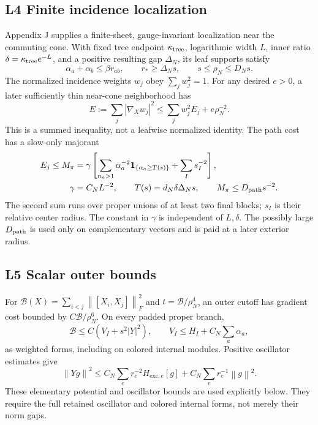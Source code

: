 \documentclass[11pt,letterpaper]{article}
\theoremstyle{definition}\newtheorem{hypothesis}[theorem]{Hypothesis}
\newcommand{\exc}{\mathrm{exc}}
\newcommand{\norm}[1]{\left\lVert #1\right\rVert}
\numberwithin{equation}{section}
\begin{document}
\subsection{L4 Finite incidence localization}
Appendix J supplies a finite-sheet, gauge-invariant localization near the commuting cone. With fixed tree endpoint $\kappa_{\rm tree}$, logarithmic width $L$, inner ratio $\delta=\kappa_{\rm tree}e^{-L}$, and a positive resulting gap $\Delta_N$, its leaf supports satisfy
\begin{equation}
 \alpha_a+\alpha_b\le\beta r_{ab},\qquad
 r_*\ge\Delta_Ns,\qquad s\le\rho_N\le D_Ns.\label{eq:shapes}
\end{equation}
The normalized incidence weights $w_j$ obey $\sum_jw_j^2=1$. For any desired $e>0$, a later sufficiently thin near-cone neighborhood has
\begin{equation}
 E:=\sum_j|\nabla_Xw_j|^2\le\sum_jw_j^2E_j+e\rho_N^{-2}.\label{eq:imsdefect}
\end{equation}
This is a summed inequality, not a leafwise normalized identity. The path cost has a slow-only majorant
\begin{align}
 E_j\le M_\pi&=\gamma\left[
 \sum_{n_a>1}\alpha_a^{-2}\mathbf1_{\{\alpha_a\ge T(s)\}}
 +\sum_{I}s_I^{-2}\right],\label{eq:majorant}\\
 \gamma&=C_NL^{-2},\qquad T(s)=d_N\delta\Delta_Ns,\qquad M_\pi\le D_{\rm path}s^{-2}.
\end{align}
The second sum runs over proper unions of at least two final blocks; $s_I$ is their relative center radius. The constant in $\gamma$ is independent of $L,\delta$. The possibly large $D_{\rm path}$ is used only on complementary vectors and is paid at a later exterior radius.

\subsection{L5 Scalar outer bounds}
For $\mathcal B(X)=\sum_{i<j}\norm{[X_i,X_j]}_F^2$ and $t=\mathcal B/\rho_N^4$, an outer cutoff has gradient cost bounded by $C\mathcal B/\rho_N^6$. On every padded proper branch,
\begin{equation}
 \mathcal B\le C(V_I+s^2|Y|^2),\qquad
 V_I\le H_I+C_N\sum_a\alpha_a,
\end{equation}
as weighted forms, including on colored internal modules. Positive oscillator estimates give
\begin{equation}
 \norm{Yg}^2\le C_N\sum_er_e^{-2}H_{\exc,e}[g]
                       +C_N\sum_er_e^{-1}\norm{g}^2.\label{eq:osc}
\end{equation}
These elementary potential and oscillator bounds are used explicitly below. They require the full retained oscillator and colored internal forms, not merely their norm gaps.
\end{document}
